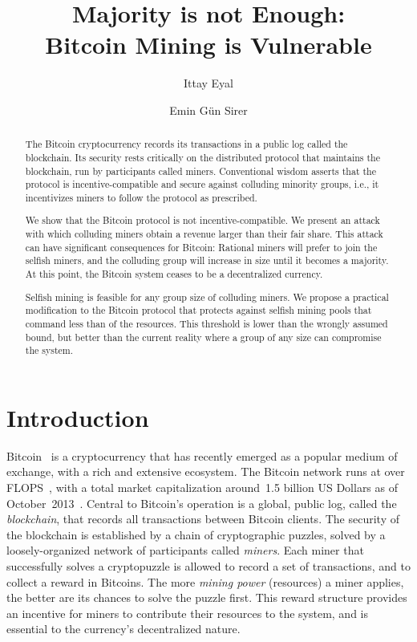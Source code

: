 \documentclass[letterpaper]{llncs}
\title{ 
Majority is not Enough: \\
Bitcoin Mining is Vulnerable
}
\date{}
\author{Ittay Eyal \and Emin G\"un Sirer}
\institute{Department of Computer Science, Cornell University \\
               ittay.eyal@cornell.edu, egs@systems.cs.cornell.edu \\
               \negspace\negspace\negspace}
\begin{document}
 

\maketitle



\begin{abstract} 
The Bitcoin cryptocurrency records its transactions in a public log called the blockchain. Its security rests critically on the distributed protocol that maintains the blockchain, run by participants called miners. 
Conventional wisdom asserts that the protocol is incentive-compatible and secure against colluding minority groups, i.e., it incentivizes miners to follow the protocol as prescribed. 

We show that the Bitcoin protocol is not incentive-compatible. We present an attack with which colluding miners obtain a revenue larger than their fair share. 
This attack can have significant consequences for Bitcoin: Rational miners will prefer to join the selfish miners, and the colluding group will increase in size until it becomes a majority. At this point, the Bitcoin system ceases to be a decentralized currency. 

Selfish mining is feasible for any group size of colluding miners.
We propose a practical modification to the Bitcoin protocol that protects against selfish mining pools that command less than  of the resources. 
This threshold is lower than the wrongly assumed  bound, but better than the current reality where a group of any size can compromise the system. 
\end{abstract} 



    \section{Introduction} \label{sec:intro}
    
Bitcoin~\cite{nakamoto2008bitcoin} is a cryptocurrency that has recently emerged as a popular medium of exchange, with a rich and extensive ecosystem. 
The Bitcoin network runs at over  FLOPS~\cite{bitcoinCharts2013stats}, with a total market capitalization around~1.5 billion US Dollars as of October~2013~\cite{blockchain2013marketCap}. 
Central to Bitcoin's operation is a global, public log, called the {\em blockchain}, that records all transactions between Bitcoin clients.
The security of the blockchain is established by a chain of cryptographic puzzles, solved by a loosely-organized network of participants called {\em miners}. 
Each miner that successfully solves a cryptopuzzle is allowed to record a set of transactions, and to collect a reward in Bitcoins.
The more \emph{mining power} (resources) a miner applies, the better are its chances to solve the puzzle first. 
This reward structure provides an incentive for miners to contribute their resources to the system, and is essential to the currency's decentralized nature. 
\end{document}
